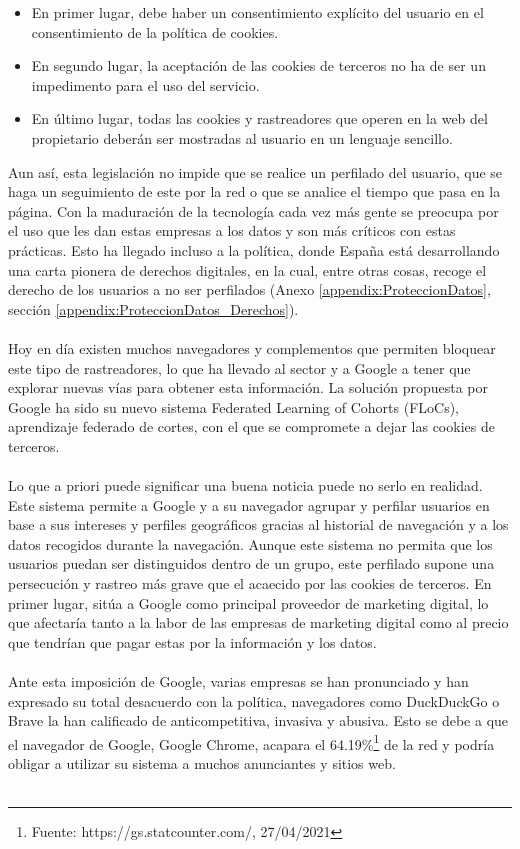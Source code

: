 \begin{itemize}
    \item En primer lugar, debe haber un consentimiento explícito del usuario en el consentimiento de la política de cookies. 
    \item En segundo lugar, la aceptación de las cookies de terceros no ha de ser un impedimento para el uso del servicio.
    \item En último lugar, todas las cookies y rastreadores que operen en la web del propietario deberán ser mostradas al usuario en un lenguaje sencillo.
\end{itemize} 
Aun así, esta legislación no impide que se realice un perfilado del usuario, que se haga un seguimiento de este por la red o que se analice el tiempo que pasa en la página. Con la maduración de la tecnología cada vez más gente se preocupa por el uso que les dan estas empresas a los datos y son más críticos con estas prácticas. Esto ha llegado incluso a la política, donde España está desarrollando una carta pionera de derechos digitales, en la cual, entre otras cosas, recoge el derecho de los usuarios a no ser perfilados (Anexo \ref{appendix:ProteccionDatos}, sección \ref{appendix:ProteccionDatos_Derechos}).
\\ \\
Hoy en día existen muchos navegadores y complementos que permiten bloquear este tipo de rastreadores, lo que ha llevado al sector y a Google a tener que explorar nuevas vías para obtener esta información. La solución propuesta por Google ha sido su nuevo sistema Federated Learning of Cohorts (FLoCs)\autocite{BuildingPrivacyfirstFuture2021}, aprendizaje federado de cortes, con el que se compromete a dejar las cookies de terceros.
\\ \\
Lo que a priori puede significar una buena noticia puede no serlo en realidad. Este sistema permite a Google y a su navegador agrupar y perfilar usuarios en base a sus intereses y perfiles geográficos gracias al historial de navegación y a los datos recogidos durante la navegación. Aunque este sistema no permita que los usuarios puedan ser distinguidos dentro de un grupo, este perfilado supone una persecución y rastreo más grave que el acaecido por las cookies de terceros. En primer lugar, sitúa a Google como principal proveedor de marketing digital, lo que afectaría tanto a la labor de las empresas de marketing digital como al precio que tendrían que pagar estas por la información y los datos.
\\ \\
Ante esta imposición de Google, varias empresas se han pronunciado y han expresado su total desacuerdo con la política, navegadores como DuckDuckGo o Brave la han calificado de anticompetitiva, invasiva y abusiva. Esto se debe a que el navegador de Google, Google Chrome, acapara el 64.19\%\footnote{Fuente: https://gs.statcounter.com/, 27/04/2021} de la red y podría obligar a utilizar su sistema a muchos anunciantes y sitios web.
\\ \\  
